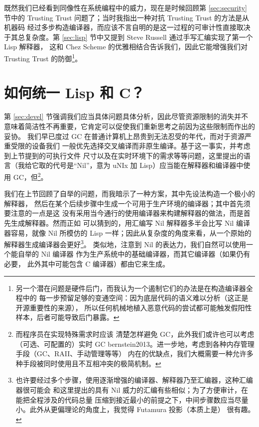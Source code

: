 既然我们已经看到同像性在系统编程中的威力，现在是时候回顾第 \ref{sec:security}
节中的 Trusting Trust 问题了；当时我指出一种对抗 Trusting Trust 的方法是从机器码
经过多步构造编译器，而应该不言自明的是这一过程的可审计性直接取决于其总复杂度。第
\ref{sec:lisp} 节中又提到 Steve Russell 通过手写汇编实现了第一个 Lisp 解释器，
这和 Chez Scheme 的优雅相结合告诉我们，因此它能增强我们对 Trusting Trust 的防御\footnote%
{另一个潜在问题是硬件后门，而我认为一个遏制它们的办法是在构造编译器全程中的
每一步预留足够的变通空间：因为底层代码的语义难以分析（这正是开源重要性的来源），
所以任何机械地植入恶意代码的尝试都可能触发假阳性样本，后者可能导致后门暴露。}。

\section{如何统一 Lisp 和 C？}\label{sec:howto}

第 \ref{sec:devel} 节强调我们应当具体问题具体分析，因此尽管资源限制的消失并不
意味着简洁性不再重要，它肯定可以促使我们重新思考之前因为这些限制而作出的妥协。
我们早已度过 GC 在普通计算机上昂贵到无法忍受的年代，而对于资源严重受限的设备我们
一般优先选择交叉编译而非原生编译。基于这一事实，并考虑到上节提到的可执行文件
尺寸以及在实时环境下的需求等等问题，这里提出的语言（我给它取的代号是“Nil”，意为
uNIx 加 Lisp）应当能在解释器和编译器中使用 GC，但\footnote{而程序员在实现特殊需求时应该
清楚怎样避免 GC，此外我们或许也可以考虑（可选、可配置的）实时 GC\cupercite%
{bernstein2013}。进一步地，考虑到各种内存管理手段（GC、RAII、手动管理等等）
内在的优缺点，我们大概需要一种允许多种手段被同时使用且不互相冲突的极简机制。}。

我们在上节回顾了自举的问题，而我暗示了一种方案，其中先设法构造一个极小的解释器，
然后在某个后续步骤中生成一个可用于生产环境的编译器；其中首先须要注意的一点是这
没有采用当今通行的使用编译器来构建解释器的做法，而是首先生成解释器。然而正如
可以猜到的，用汇编写 Nil 解释器多半会比写 Nil 编译器容易，就像 Nil 所模仿的
Lisp 一样；因此从复杂度的角度来看，从一个原始的解释器生成编译器会更好\footnote%
{也许要经过多个步骤，使用逐渐增强的编译器、解释器乃至汇编器，这种汇编器很可能会
和这里提出的具有 Nil 威力的汇编有些相似；为了方便审计，在能把全程涉及的代码总量
压缩到接近最小的前提之下，中间步骤数应当尽量小。此外从更偏理论的角度上，我觉得
Futamura 投影（本质上是） 很有趣。}。
类似地，注意到 Nil 的表达力，我们自然可以使用一个能自举的 Nil 编译器
作为生产系统中的基础编译器，而其它编译器（如果仍有必要，
此外其中可能包含 C 编译器）都由它来生成。

